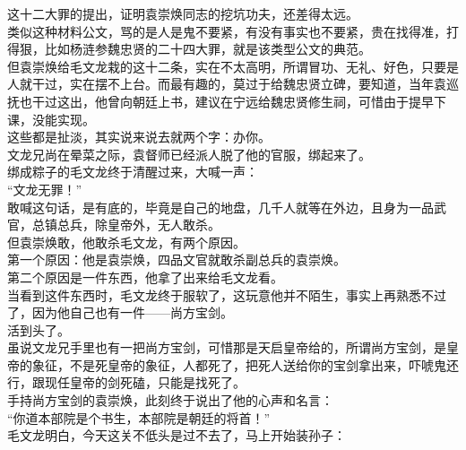 \begin{multicols}{\theparacolNo}
这十二大罪的提出，证明袁崇焕同志的挖坑功夫，还差得太远。\\

类似这种材料公文，骂的是人是鬼不要紧，有没有事实也不要紧，贵在找得准，打得狠，比如杨涟参魏忠贤的二十四大罪，就是该类型公文的典范。\\

但袁崇焕给毛文龙栽的这十二条，实在不太高明，所谓冒功、无礼、好色，只要是人就干过，实在摆不上台。而最有趣的，莫过于给魏忠贤立碑，要知道，当年袁巡抚也干过这出，他曾向朝廷上书，建议在宁远给魏忠贤修生祠，可惜由于提早下课，没能实现。\\

这些都是扯淡，其实说来说去就两个字：办你。\\

文龙兄尚在晕菜之际，袁督师已经派人脱了他的官服，绑起来了。\\

绑成粽子的毛文龙终于清醒过来，大喊一声：\\

“文龙无罪！”\\

敢喊这句话，是有底的，毕竟是自己的地盘，几千人就等在外边，且身为一品武官，总镇总兵，除皇帝外，无人敢杀。\\

但袁崇焕敢，他敢杀毛文龙，有两个原因。\\

第一个原因：他是袁崇焕，四品文官就敢杀副总兵的袁崇焕。\\

第二个原因是一件东西，他拿了出来给毛文龙看。\\

当看到这件东西时，毛文龙终于服软了，这玩意他并不陌生，事实上再熟悉不过了，因为他自己也有一件——尚方宝剑。\\

活到头了。\\

虽说文龙兄手里也有一把尚方宝剑，可惜那是天启皇帝给的，所谓尚方宝剑，是皇帝的象征，不是死皇帝的象征，人都死了，把死人送给你的宝剑拿出来，吓唬鬼还行，跟现任皇帝的剑死磕，只能是找死了。\\

手持尚方宝剑的袁崇焕，此刻终于说出了他的心声和名言：\\

“你道本部院是个书生，本部院是朝廷的将首！”\\

毛文龙明白，今天这关不低头是过不去了，马上开始装孙子：\\


\end{multicols}
